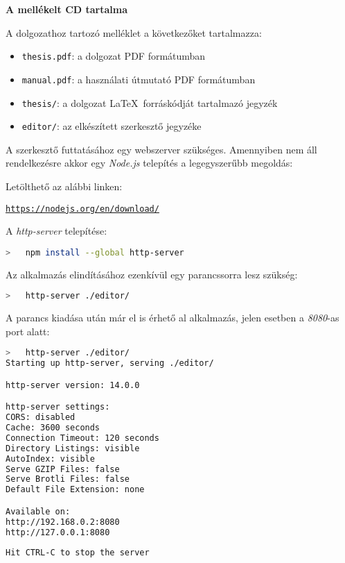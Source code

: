 \pagestyle{empty}

\noindent \textbf{\Large A mellékelt CD tartalma}

\vskip 1cm

\noindent A dolgozathoz tartozó melléklet a következőket tartalmazza:

\begin{itemize}
\item \texttt{thesis.pdf}: a dolgozat PDF formátumban
\item \texttt{manual.pdf}: a használati útmutató PDF formátumban
\item \texttt{thesis/}: a dolgozat \LaTeX\ forráskódját tartalmazó jegyzék
\item \texttt{editor/}: az elkészített szerkesztő jegyzéke
\end{itemize}

\vskip 0.5cm

\noindent
A szerkesztő futtatásához egy webszerver szükséges. Amennyiben nem áll rendelkezésre akkor egy \textit{Node.js} telepítés a legegyszerűbb megoldás:

\vskip 0.5cm
\noindent
Letölthető az alábbi linken:

\href{https://nodejs.org/en/download/}{\texttt{https://nodejs.org/en/download/}}

\vskip 0.5cm
\noindent
A \textit{http-server} telepítése:

\begin{lstlisting}[language=bash]
>   npm install --global http-server
\end{lstlisting}

\vskip 0.5cm

\noindent
Az alkalmazás elindításához ezenkívül egy parancssorra lesz szükség:

\begin{lstlisting}[language=bash]
>   http-server ./editor/
\end{lstlisting}

\vskip 0.5cm

\noindent
A parancs kiadása után már el is érhető al alkalmazás, jelen esetben a \textit{8080}-as port alatt:

\begin{lstlisting}[language=bash, alsoletter=0123456789, morekeywords={visible, none, disabled, seconds, 3600, 120, 8080}]
>   http-server ./editor/
Starting up http-server, serving ./editor/

http-server version: 14.0.0

http-server settings:
CORS: disabled
Cache: 3600 seconds
Connection Timeout: 120 seconds
Directory Listings: visible
AutoIndex: visible
Serve GZIP Files: false
Serve Brotli Files: false
Default File Extension: none

Available on:
http://192.168.0.2:8080
http://127.0.0.1:8080
	
Hit CTRL-C to stop the server
\end{lstlisting}
